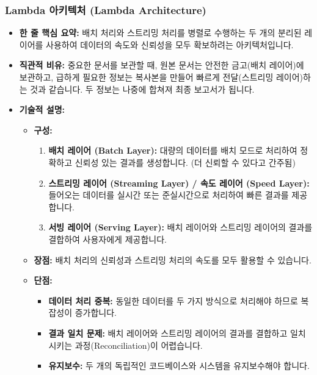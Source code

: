 \documentclass[11pt,a4paper]{article}
\begin{document}
\subsubsection{Lambda 아키텍처 (Lambda Architecture)}
\begin{itemize}
    \item \textbf{한 줄 핵심 요약:} 배치 처리와 스트리밍 처리를 병렬로 수행하는 두 개의 분리된 레이어를 사용하여 데이터의 속도와 신뢰성을 모두 확보하려는 아키텍처입니다.
    \item \textbf{직관적 비유:} 중요한 문서를 보관할 때, 원본 문서는 안전한 금고(배치 레이어)에 보관하고, 급하게 필요한 정보는 복사본을 만들어 빠르게 전달(스트리밍 레이어)하는 것과 같습니다. 두 정보는 나중에 합쳐져 최종 보고서가 됩니다.
    \item \textbf{기술적 설명:}
    \begin{itemize}
        \item \textbf{구성:}
        \begin{enumerate}
            \item \textbf{배치 레이어 (Batch Layer):} 대량의 데이터를 배치 모드로 처리하여 정확하고 신뢰성 있는 결과를 생성합니다. (더 신뢰할 수 있다고 간주됨)
            \item \textbf{스트리밍 레이어 (Streaming Layer) / 속도 레이어 (Speed Layer):} 들어오는 데이터를 실시간 또는 준실시간으로 처리하여 빠른 결과를 제공합니다.
            \item \textbf{서빙 레이어 (Serving Layer):} 배치 레이어와 스트리밍 레이어의 결과를 결합하여 사용자에게 제공합니다.
        \end{enumerate}
        \item \textbf{장점:} 배치 처리의 신뢰성과 스트리밍 처리의 속도를 모두 활용할 수 있습니다.
        \item \textbf{단점:}
        \begin{itemize}
            \item \textbf{데이터 처리 중복:} 동일한 데이터를 두 가지 방식으로 처리해야 하므로 복잡성이 증가합니다.
            \item \textbf{결과 일치 문제:} 배치 레이어와 스트리밍 레이어의 결과를 결합하고 일치시키는 과정(Reconciliation)이 어렵습니다.
            \item \textbf{유지보수:} 두 개의 독립적인 코드베이스와 시스템을 유지보수해야 합니다.
        \end{itemize}
    \end{itemize}
\end{itemize}
\end{document}
